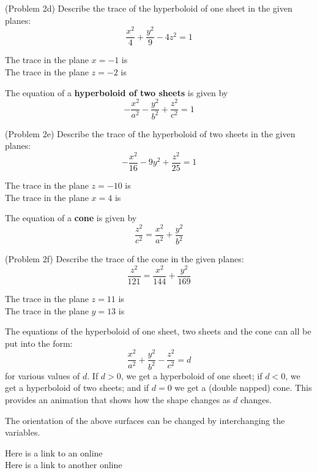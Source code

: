 \documentclass[handout]{ximera}
\begin{document}
\begin{problem}(Problem 2d)
Describe the trace of the hyperboloid of one sheet in the given planes:
\[
\frac{x^2}{4} + \frac{y^2}{9} - 4z^2 = 1
\]

The trace in the plane $x = -1$ is \\
The trace in the plane $z = -2$ is \\
\end{problem}

The equation of a \textbf{hyperboloid of two sheets} is given by 
\[
-\frac{x^2}{a^2} -\frac{y^2}{b^2} + \frac{z^2}{c^2} = 1
\]


\begin{problem}(Problem 2e)
Describe the trace of the hyperboloid of two sheets in the given planes:
\[
-\frac{x^2}{16} - 9y^2 + \frac{z^2}{25} = 1
\]

The trace in the plane $z = -10$ is \\
The trace in the plane $x = 4$ is 
\end{problem}



The equation of a \textbf{cone} is given by 
\[
\frac{z^2}{c^2} = \frac{x^2}{a^2} + \frac{y^2}{b^2}
\]

\begin{problem}(Problem 2f)
Describe the trace of the cone in the given planes:
\[
\frac{z^2}{121} = \frac{x^2}{144} + \frac{y^2}{169}
\]

The trace in the plane $z = 11$ is \\
The trace in the plane $y = 13$ is 
\end{problem}


The equations of the hyperboloid of one sheet, two sheets and the cone can all be put into the form:
\[
 \frac{x^2}{a^2} + \frac{y^2}{b^2} - \frac{z^2}{c^2} = d
\]
for various values of $d$.  If $d > 0$, we get a hyperboloid of one sheet; if $d< 0$, we get a 
hyperboloid of two sheets; and if $d= 0$ we get a (double napped) cone.
This  provides an 
animation that shows how the shape changes as $d$ changes.\\


\begin{remark}
The orientation of the above surfaces can be changed by interchanging the variables.
\end{remark}

Here is a link to an online \\
Here is a link to another online 
\end{document}
